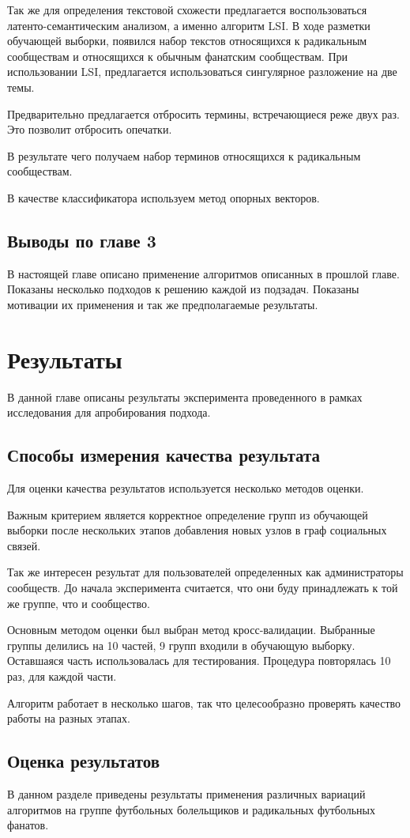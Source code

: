 \documentclass[annotation,times,page4]{itmo-student-thesis}
\begin{document}
Так же для определения текстовой схожести предлагается воспользоваться латенто-семантическим анализом, а именно алгоритм LSI. В ходе разметки обучающей выборки, появился набор текстов относящихся к радикальным сообществам и относящихся к обычным фанатским сообществам. При использовании LSI, предлагается использоваться сингулярное разложение на две темы.

Предварительно предлагается отбросить термины, встречающиеся реже двух раз. Это позволит отбросить опечатки. 

В результате чего получаем набор терминов относящихся к радикальным сообществам.   

В качестве классификатора используем метод опорных векторов. 

 
\section{Выводы по главе 3}
В настоящей главе описано применение алгоритмов описанных в прошлой главе. Показаны несколько подходов к решению каждой из подзадач. Показаны мотивации их применения и так же предполагаемые результаты. 
\chapter{Результаты}
В данной главе описаны результаты эксперимента проведенного в рамках исследования для апробирования подхода.
\section{Способы измерения качества результата}
Для оценки качества результатов используется несколько методов оценки.

Важным критерием является корректное определение групп из обучающей выборки после нескольких этапов добавления новых узлов в граф социальных связей. 

Так же интересен результат для пользователей определенных как администраторы сообществ. До начала эксперимента считается, что они буду принадлежать к той же группе, что и сообщество.

Основным методом оценки был выбран метод кросс-валидации. Выбранные группы делились на 10 частей, 9 групп входили в обучающую выборку. Оставшаяся часть использовалась для тестирования. Процедура повторялась 10 раз, для каждой части.

Алгоритм работает в несколько шагов, так что целесообразно проверять качество работы на разных этапах.
\section{Оценка результатов}
В данном разделе приведены результаты применения различных вариаций алгоритмов на группе футбольных болельщиков и радикальных футбольных фанатов.
\end{document}

